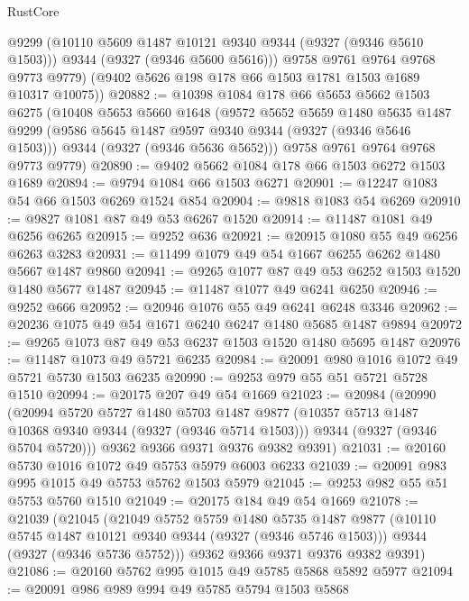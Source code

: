 \begin{lexlean}{RustCore}
\begin{coremodule}
          @9299
          (@10110 @5609 @1487 @10121 @9340 @9344 (@9327 (@9346 @5610 @1503)))
          @9344
          (@9327 (@9346 @5600 @5616)))
        @9758
        @9761
        @9764
        @9768
        @9773
        @9779)
      (@9402 @5626 @198 @178 @66 @1503 @1781 @1503 @1689 @10317 @10075))
@20882 := @10398
    @1084
    @178
    @66
    @5653
    @5662
    @1503
    @6275
    (@10408
      @5653
      @5660
      @1648
      (@9572
        @5652
        @5659
        @1480
        @5635
        @1487
        @9299
        (@9586 @5645 @1487 @9597 @9340 @9344 (@9327 (@9346 @5646 @1503)))
        @9344
        (@9327 (@9346 @5636 @5652)))
      @9758
      @9761
      @9764
      @9768
      @9773
      @9779)
@20890 := @9402 @5662 @1084 @178 @66 @1503 @6272 @1503 @1689
@20894 := @9794 @1084 @66 @1503 @6271
@20901 := @12247 @1083 @54 @66 @1503 @6269 @1524 @854
@20904 := @9818 @1083 @54 @6269
@20910 := @9827 @1081 @87 @49 @53 @6267 @1520
@20914 := @11487 @1081 @49 @6256 @6265
@20915 := @9252 @636
@20921 := @20915 @1080 @55 @49 @6256 @6263 @3283
@20931 := @11499 @1079 @49 @54 @1667 @6255 @6262 @1480 @5667 @1487 @9860
@20941 := @9265 @1077 @87 @49 @53 @6252 @1503 @1520 @1480 @5677 @1487
@20945 := @11487 @1077 @49 @6241 @6250
@20946 := @9252 @666
@20952 := @20946 @1076 @55 @49 @6241 @6248 @3346
@20962 := @20236 @1075 @49 @54 @1671 @6240 @6247 @1480 @5685 @1487 @9894
@20972 := @9265 @1073 @87 @49 @53 @6237 @1503 @1520 @1480 @5695 @1487
@20976 := @11487 @1073 @49 @5721 @6235
@20984 := @20091 @980 @1016 @1072 @49 @5721 @5730 @1503 @6235
@20990 := @9253 @979 @55 @51 @5721 @5728 @1510
@20994 := @20175 @207 @49 @54 @1669
@21023 := @20984
    (@20990
      (@20994
        @5720
        @5727
        @1480
        @5703
        @1487
        @9877
        (@10357 @5713 @1487 @10368 @9340 @9344 (@9327 (@9346 @5714 @1503)))
        @9344
        (@9327 (@9346 @5704 @5720)))
      @9362
      @9366
      @9371
      @9376
      @9382
      @9391)
@21031 := @20160 @5730 @1016 @1072 @49 @5753 @5979 @6003 @6233
@21039 := @20091 @983 @995 @1015 @49 @5753 @5762 @1503 @5979
@21045 := @9253 @982 @55 @51 @5753 @5760 @1510
@21049 := @20175 @184 @49 @54 @1669
@21078 := @21039
    (@21045
      (@21049
        @5752
        @5759
        @1480
        @5735
        @1487
        @9877
        (@10110 @5745 @1487 @10121 @9340 @9344 (@9327 (@9346 @5746 @1503)))
        @9344
        (@9327 (@9346 @5736 @5752)))
      @9362
      @9366
      @9371
      @9376
      @9382
      @9391)
@21086 := @20160 @5762 @995 @1015 @49 @5785 @5868 @5892 @5977
@21094 := @20091 @986 @989 @994 @49 @5785 @5794 @1503 @5868

\end{coremodule}
\end{lexlean}
